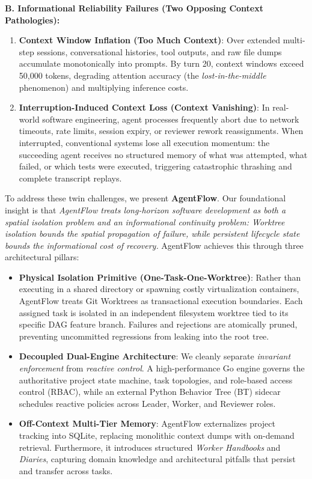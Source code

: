 \documentclass[conference]{IEEEtran}
\begin{document}
\noindent\textbf{B. Informational Reliability Failures (Two Opposing Context Pathologies):}
\begin{enumerate}
    \item \textbf{Context Window Inflation (Too Much Context)}: Over extended multi-step sessions, conversational histories, tool outputs, and raw file dumps accumulate monotonically into prompts. By turn 20, context windows exceed 50,000 tokens, degrading attention accuracy (the \textit{lost-in-the-middle} phenomenon) and multiplying inference costs.
    \item \textbf{Interruption-Induced Context Loss (Context Vanishing)}: In real-world software engineering, agent processes frequently abort due to network timeouts, rate limits, session expiry, or reviewer rework reassignments. When interrupted, conventional systems lose all execution momentum: the succeeding agent receives no structured memory of what was attempted, what failed, or which tests were executed, triggering catastrophic thrashing and complete transcript replays.
\end{enumerate}

To address these twin challenges, we present \textbf{AgentFlow}. Our foundational insight is that \textit{AgentFlow treats long-horizon software development as both a spatial isolation problem and an informational continuity problem: Worktree isolation bounds the spatial propagation of failure, while persistent lifecycle state bounds the informational cost of recovery.} AgentFlow achieves this through three architectural pillars:

\begin{itemize}
    \item \textbf{Physical Isolation Primitive (One-Task-One-Worktree)}: Rather than executing in a shared directory or spawning costly virtualization containers, AgentFlow treats Git Worktrees as transactional execution boundaries. Each assigned task is isolated in an independent filesystem worktree tied to its specific DAG feature branch. Failures and rejections are atomically pruned, preventing uncommitted regressions from leaking into the root tree.
    \item \textbf{Decoupled Dual-Engine Architecture}: We cleanly separate \textit{invariant enforcement} from \textit{reactive control}. A high-performance Go engine governs the authoritative project state machine, task topologies, and role-based access control (RBAC), while an external Python Behavior Tree (BT) sidecar schedules reactive policies across Leader, Worker, and Reviewer roles.
    \item \textbf{Off-Context Multi-Tier Memory}: AgentFlow externalizes project tracking into SQLite, replacing monolithic context dumps with on-demand retrieval. Furthermore, it introduces structured \textit{Worker Handbooks} and \textit{Diaries}, capturing domain knowledge and architectural pitfalls that persist and transfer across tasks.
\end{itemize}
\end{document}
